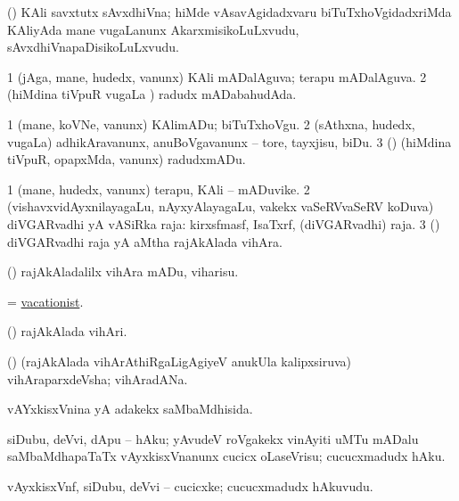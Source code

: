 \bentry
{} 
\gl{\nA}
\expl{}
\bmng
 (\birx) KAli savxtutx sAvxdhiVna; hiMde vAsavAgidadxvaru biTuTxhoVgidadxriMda KAliyAda mane \mo vugaLanunx AkarxmisikoLuLxvudu, sAvxdhiVnapaDisikoLuLxvudu. 
\emng
\eentry

\bentry
{} 
\gl{\gu}
\expl{}
\bmng
\bnum
\num{1} (jAga, mane, hudedx, \mo vanunx) KAli mADalAguva; terapu mADalAguva. 
\num{2} (hiMdina tiVpuR \mo vugaLa \vi) radudx mADabahudAda. 
\enum
\emng
\eentry

\bentry
{} 
\gl{\sakirx}
\expl{}
\bmng
\bnum
\num{1} (mane, koVNe, \mo vanunx) KAlimADu; biTuTxhoVgu. 
\num{2} (sAthxna, hudedx, \mo vugaLa) adhikAravanunx, anuBoVgavanunx -- tore, tayxjisu, biDu. 
\num{3} (\nAyxshA) (hiMdina tiVpuR, opapxMda, \mo vanunx) radudxmADu. 
\enum
\emng
\eentry

\bentry
{} 
\gl{\nA}
\expl{}
\bmng
\bnum
\num{1} (mane, hudedx, \mo vanunx) terapu, KAli -- mADuvike. 
\num{2} (vishavxvidAyxnilayagaLu, nAyxyAlayagaLu, \mo vakekx vaSeRVvaSeRV koDuva) diVGARvadhi yA vASiRka raja: kirxsfmasf, IsaTxrf, \mo (diVGARvadhi) raja. 
\num{3} (\ame) diVGARvadhi raja yA aMtha rajAkAlada vihAra. 
\enum
\emng
\eentry
 
\bentry
{} 
\gl{\akirx}
\expl{}
\bmng
 (\ame) rajAkAladalilx vihAra mADu, viharisu. 
\emng
\eentry

\bentry
{} 
\gl{\nA}
\expl{}
\bmng
= \hyperlink{vacationist}{vacationist}. 
\emng
\eentry

\bentry
{} 
\gl{\nA}
\expl{}
\bmng
 (\ame) rajAkAlada vihAri. 
\emng
\eentry

\bentry
{}
\gl{\nA}
\expl{}
\bmng
 (\ame) (rajAkAlada vihArAthiRgaLigAgiyeV anukUla kalipxsiruva) vihAraparxdeVsha; vihAradANa. 
\emng
\eentry

\bentry
{} 
\gl{\gu}
\expl{}
\bmng
 vAYxkisxVnina yA adakekx saMbaMdhisida. 
\emng
\eentry

\bentry
{} 
\gl{\sakirx}
\expl{}
\bmng
 siDubu, deVvi, dApu -- hAku; yAvudeV roVgakekx vinAyiti uMTu mADalu saMbaMdhapaTaTx vAyxkisxVnanunx cucicx oLaseVrisu; cucucxmadudx hAku. 
\emng
\eentry

\bentry
{} 
\gl{\nA}
\expl{}
\bmng
 vAyxkisxVnf, siDubu, deVvi -- cucicxke; cucucxmadudx hAkuvudu. 
\emng
\eentry

